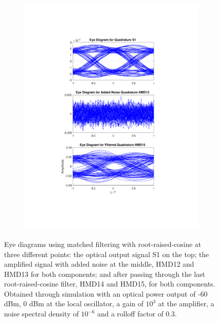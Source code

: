 \begin{figure}[H]
\begin{subfigure}{.45\textwidth}
		\includegraphics[clip, trim=5cm 4cm 5cm 4cm, width=\textwidth]{./sdf/m_qam_system/figures/eyes/q_p_60_03.pdf}
	\end{subfigure}
	
	\caption{Eye diagrams using matched filtering with root-raised-cosine at three different points: the optical output signal S1 on the top; the amplified signal with added noise at the middle, HMD12 and HMD13 for both components; and after passing through the last root-raised-cosine filter, HMD14 and HMD15, for both components. Obtained through simulation with an optical power output of -60 dBm, 0 dBm at the local oscillator, a gain of $10^3$ at the amplifier, a noise spectral density of $10^{-6}$ and a rolloff factor of 0.3.\label{fig:eyes_n_rrc_60_03}}
	
\end{figure}

